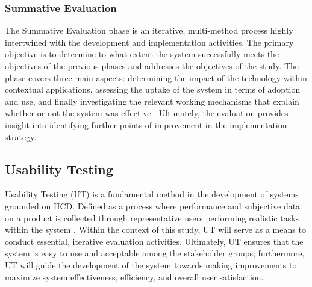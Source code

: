\documentclass[11pt,a4paper,titlepage]{article}
\begin{document}
	\subsubsection{Summative Evaluation}
	The Summative Evaluation phase is an iterative, multi-method process highly intertwined with the development and implementation activities. The primary objective is to determine to what extent the system successfully meets the objectives of the previous phases and addresses the objectives of the study. The phase covers three main aspects: determining the impact of the technology within contextual applications, assessing the uptake of the system in terms of adoption and use, and finally investigating the relevant working mechanisms that explain whether or not the system was effective \cite{Kip2025CeHRes}. Ultimately, the evaluation provides insight into identifying further points of improvement in the implementation strategy. 
	
	\subsection{Usability Testing}
	Usability Testing (UT) is a fundamental method in the development of systems grounded on HCD. Defined as a process where performance and subjective data on a product is collected through representative users performing realistic tasks within the system \cite{lewis2012usability}. Within the context of this study, UT will serve as a means to conduct essential, iterative evaluation activities. Ultimately, UT ensures that the system is easy to use and acceptable among the stakeholder groups; furthermore, UT will guide the development of the system towards making improvements to maximize system effectiveness, efficiency, and overall user satisfaction.  
\end{document}
